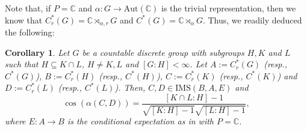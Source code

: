 \documentclass[a4]{amsart}
\newtheorem{corollary}[theorem]{\bf Corollary}
\numberwithin{equation}{section}
\newcommand{\C}{\mathbb{C}}
\begin{document}
    Note that, if $P=\C$ and $\alpha: G \to \mathrm{Aut}(\C)$ is the
        trivial representation, then we know that $C^*_r(G) = \C
        \rtimes_{\alpha, r} G$ and $C^*(G) = \C \rtimes_{\alpha}
        G$. Thus, we readily deduced the following:

        \begin{corollary}\label{angle-gp-algebras}
          Let $G$ be a countable discrete group with subgroups $H, K$
          and $L$ such that $H \subseteq K \cap L$, $H \neq K , L$ and
          $[G:H]< \infty$.  Let $A:=C^*_r(G)$ (resp., $C^*(G)$),
          $B:=C^*_r(H)$ (resp., $C^*(H)$), $C:=C^*_r(K)$ (resp.,
          $C^*(K)$) and $D:=C^*_r(L)$ (resp., $C^*(L)$). Then, $C, D
          \in \mathrm{IMS} (B, A, E)$ and
   \begin{equation}\label{angle-CrG}
\cos(\alpha(C,D)) = \frac{[K\cap L: H] - 1}{\sqrt{[K:H]-1}\sqrt{[L:H]-1}},
  \end{equation}
where $E: A \to B$ is the conditional expectation as in  with $P=\C$.  
\end{corollary}
\end{document}
